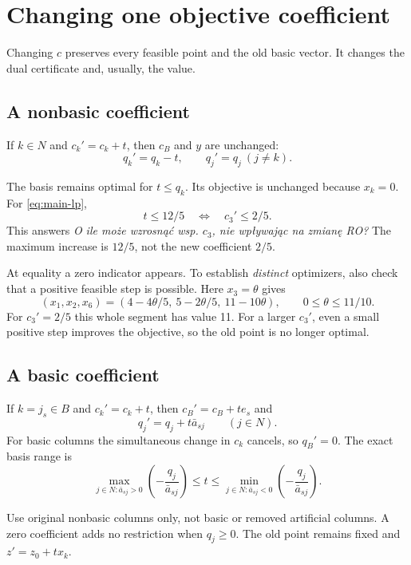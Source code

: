 \documentclass[11pt,a4paper]{article}
\begin{document}
\section{Changing one objective coefficient}\label{sec:cost}
Changing $c$ preserves every feasible point and the old basic vector.
It changes the dual certificate and, usually, the value.

\subsection{A nonbasic coefficient}
\begin{lecturecore}
  If $k\in N$ and $c_k'=c_k+t$, then $c_B$ and $y$ are unchanged:
  \[
    q_k'=q_k-t,\qquad q_j'=q_j\ (j\ne k).
  \]
\end{lecturecore}
The basis remains optimal for $t\leq q_k$. Its objective is unchanged because
$x_k=0$. For \eqref{eq:main-lp},
\[
  t\leq12/5\quad\Longleftrightarrow\quad c_3'\leq2/5.
\]
This answers \emph{O ile może wzrosnąć wsp. $c_3$, nie wpływając na zmianę RO?}
The maximum increase is $12/5$, not the new coefficient $2/5$.

At equality a zero indicator appears. To establish \emph{distinct} optimizers,
also check that a positive feasible step is possible. Here $x_3=\theta$ gives
\[
  (x_1,x_2,x_6)=(4-4\theta/5,\ 5-2\theta/5,\ 11-10\theta),
  \qquad 0\leq\theta\leq11/10.
\]
For $c_3'=2/5$ this whole segment has value 11. For a larger $c_3'$,
even a small positive step improves the objective, so the old point is no
longer optimal.

\subsection{A basic coefficient}
\begin{lecturecore}
  If $k=j_s\in B$ and $c_k'=c_k+t$, then $c_B'=c_B+t e_s$ and
  \[
    q_j'=q_j+t\bar a_{sj}\qquad(j\in N).
  \]
  For basic columns the simultaneous change in $c_k$ cancels, so $q_B'=0$.
  The exact basis range is
  \begin{equation}\label{eq:basic-cost-range}
    \max_{j\in N:\bar a_{sj}>0}\left(-\frac{q_j}{\bar a_{sj}}\right)
    \leq t\leq
    \min_{j\in N:\bar a_{sj}<0}\left(-\frac{q_j}{\bar a_{sj}}\right).
  \end{equation}
\end{lecturecore}
Use original nonbasic columns only, not basic or removed artificial columns.
A zero coefficient adds no restriction when $q_j\geq0$.
The old point remains fixed and $z'=z_0+t x_k$.
\end{document}

